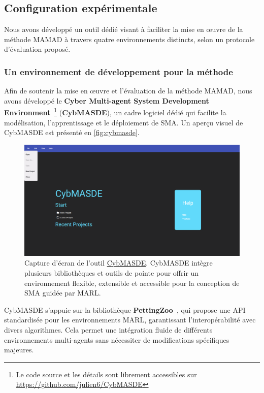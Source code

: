 \subsection{Configuration expérimentale}
\label{sec:experimental_setup}

Nous avons développé un outil dédié visant à faciliter la mise en œuvre de la méthode MAMAD à travers quatre environnements distincts, selon un protocole d'évaluation proposé.


\subsubsection{Un environnement de développement pour la méthode}

Afin de soutenir la mise en œuvre et l'évaluation de la méthode MAMAD, nous avons développé le \textbf{Cyber Multi-agent System Development Environment}~\footnote{Le code source et les détails sont librement accessibles sur \url{https://github.com/julien6/CybMASDE}} (\textbf{CybMASDE}), un cadre logiciel dédié qui facilite la modélisation, l'apprentissage et le déploiement de SMA. Un aperçu visuel de CybMASDE est présenté en \autoref{fig:cybmasde}.

\begin{figure}[h!]
    \centering
    \includegraphics[width=0.7\linewidth]{figures/CybMASDE.png}
    \caption{Capture d'écran de l'outil \href{https://github.com/julien6/CybMASDE}{CybMASDE}. CybMASDE intègre plusieurs bibliothèques et outils de pointe pour offrir un environnement flexible, extensible et accessible pour la conception de SMA guidée par MARL.}
    \label{fig:cybmasde}
\end{figure}

CybMASDE s'appuie sur la bibliothèque \textbf{PettingZoo}~\cite{Terry2021}, qui propose une API standardisée pour les environnements MARL, garantissant l'interopérabilité avec divers algorithmes. Cela permet une intégration fluide de différents environnements multi-agents sans nécessiter de modifications spécifiques majeures.

